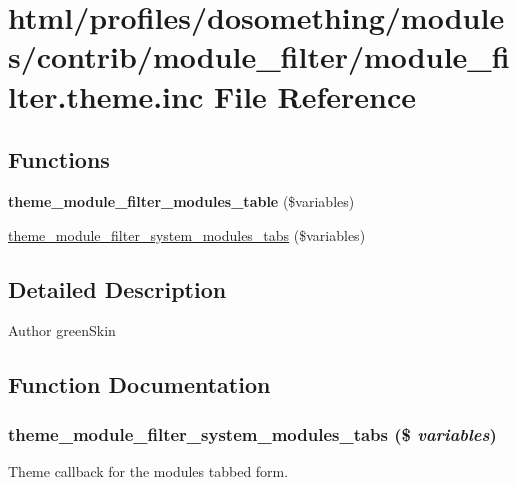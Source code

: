 \hypertarget{module__filter_8theme_8inc}{
\section{html/profiles/dosomething/modules/contrib/module\_\-filter/module\_\-filter.theme.inc File Reference}
\label{module__filter_8theme_8inc}
}
\subsection*{Functions}
\begin{DoxyCompactItemize}
\item 
\hypertarget{module__filter_8theme_8inc_a756adb53f56f080582704039e8047fd5}{
{\bfseries theme\_\-module\_\-filter\_\-modules\_\-table} (\$variables)}
\label{module__filter_8theme_8inc_a756adb53f56f080582704039e8047fd5}

\item 
\hyperlink{module__filter_8theme_8inc_a1dd4d33dd5c5c6f639ef1e1a2802f570}{theme\_\-module\_\-filter\_\-system\_\-modules\_\-tabs} (\$variables)
\end{DoxyCompactItemize}


\subsection{Detailed Description}
\begin{DoxyAuthor}{Author}
greenSkin 
\end{DoxyAuthor}


\subsection{Function Documentation}
\hypertarget{module__filter_8theme_8inc_a1dd4d33dd5c5c6f639ef1e1a2802f570}{
\subsubsection[{theme\_\-module\_\-filter\_\-system\_\-modules\_\-tabs}]{\setlength{\rightskip}{0pt plus 5cm}theme\_\-module\_\-filter\_\-system\_\-modules\_\-tabs (\$ {\em variables})}}
\label{module__filter_8theme_8inc_a1dd4d33dd5c5c6f639ef1e1a2802f570}
Theme callback for the modules tabbed form. 